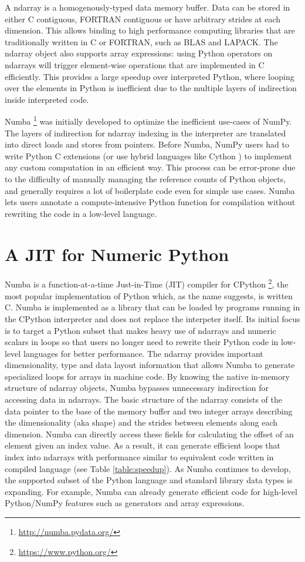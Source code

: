 \documentclass{acm_proc_article-sp}
\begin{document}
A ndarray is a homogenously-typed data memory buffer.  Data can be
stored in either C contiguous, FORTRAN contiguous or have arbitrary
strides at each dimension.  This allows binding to high performance
computing libraries that are traditionally written in C or FORTRAN,
such as BLAS and LAPACK. The ndarray object also supports array
expressions: using Python operators on ndarrays will trigger
element-wise operations that are implemented in C efficiently.  This
provides a large speedup over interpreted Python, where looping over
the elements in Python is inefficient due to the multiple layers of
indirection inside interpreted code.

Numba \footnote{\url{http://numba.pydata.org/}} was initially
developed to optimize the inefficient use-cases of NumPy.  The layers
of indirection for ndarray indexing in the interpreter are translated
into direct loads and stores from pointers.  Before Numba, NumPy users
had to write Python C extensions (or use hybrid languages like Cython
\cite{behnel:cython}) to implement any custom computation in an
efficient way.  This process can be error-prone due to the difficulty
of manually managing the reference counts of Python objects, and
generally requires a lot of boilerplate code even for simple use
cases.  Numba lets users annotate a compute-intensive Python function
for compilation without rewriting the code in a low-level language.

\section{A JIT for Numeric Python}

Numba is a function-at-a-time Just-in-Time (JIT) compiler for CPython
\footnote{\url{https://www.python.org/}}, the most popular
implementation of Python which, as the name suggests, is written C.
Numba is implemented as a library that can be loaded by programs
running in the CPython interpreter and does not replace the interpeter
itself.  Its initial focus is to target a Python subset that makes
heavy use of ndarrays and numeric scalars in loops so that users no
longer need to rewrite their Python code in low-level languages for
better performance.  The ndarray provides important dimensionality,
type and data layout information that allows Numba to generate
specialized loops for arrays in machine code.  By knowing the native
in-memory structure of ndarray objects, Numba bypasses unnecessary
indirection for accessing data in ndarrays.  The basic structure of
the ndarray consists of the data pointer to the base of the memory
buffer and two integer arrays describing the dimensionality (aka
shape) and the strides between elements along each dimension. Numba
can directly access these fields for calculating the offset of an
element given an index value.  As a result, it can generate efficient
loops that index into ndarrays with performance similar to equivalent
code written in compiled language (see Table \ref{table:speedup}). As
Numba continues to develop, the supported subset of the Python
language and standard library data types is expanding.  For example,
Numba can already generate efficient code for high-level Python/NumPy
features such as generators and array expressions.
\end{document}
